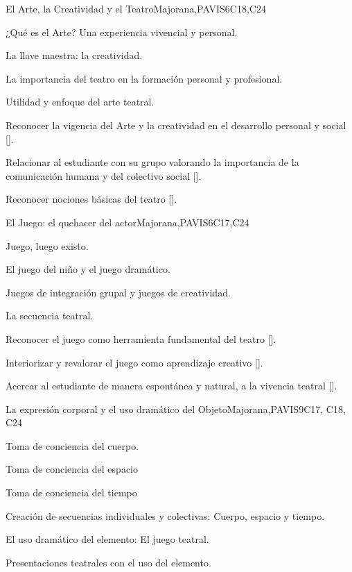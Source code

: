 \begin{syllabus}
\begin{unit}{}{El Arte, la Creatividad y el Teatro}{Majorana,PAVIS}{6}{C18,C24}
\begin{topics}
	\item ¿Qué es el Arte? Una experiencia vivencial y personal.
	\item La llave maestra: la creatividad.
	\item La importancia del teatro en la formación personal y profesional.
	\item Utilidad y enfoque del arte teatral.
\end{topics}
\begin{learningoutcomes}
	\item Reconocer la vigencia del Arte y la creatividad en el desarrollo personal y social [\Usage].
	\item Relacionar al estudiante con su grupo valorando la importancia de la comunicación humana y del colectivo  social [\Usage].
	\item Reconocer nociones  básicas del teatro [\Usage].
\end{learningoutcomes}
\end{unit}

\begin{unit}{}{El Juego: el  quehacer del actor}{Majorana,PAVIS}{6}{C17,C24}
\begin{topics}
	\item Juego, luego existo.
	\item El juego del niño y el juego dramático.
	\item Juegos de integración grupal y juegos de creatividad.
	\item La secuencia teatral.
\end{topics}
\begin{learningoutcomes}
	\item Reconocer el juego como herramienta fundamental del teatro [\Usage].
	\item Interiorizar y revalorar el juego como aprendizaje creativo [\Usage].
	\item Acercar al estudiante de manera espontánea y natural, a la vivencia teatral [\Usage].
\end{learningoutcomes}
\end{unit}

\begin{unit}{}{La expresión corporal y el uso dramático del Objeto}{Majorana,PAVIS}{9}{C17, C18, C24}
\begin{topics}
	\item Toma de conciencia del cuerpo.
	\item Toma de conciencia del espacio
	\item Toma de conciencia del tiempo
	\item Creación de secuencias individuales y colectivas: Cuerpo, espacio y tiempo.
	\item El uso dramático del elemento: El juego teatral.
	\item Presentaciones teatrales con el uso del elemento.


\end{topics}
\end{unit}
\end{syllabus}
